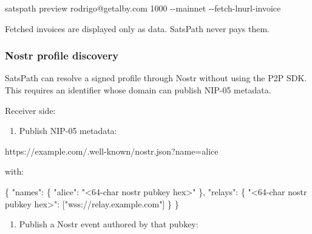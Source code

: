 \documentclass[
]{article}
\newenvironment{Shaded}{}{}
\newcommand{\AttributeTok}[1]{\textcolor[rgb]{0.49,0.56,0.16}{#1}}
\newcommand{\DataTypeTok}[1]{\textcolor[rgb]{0.56,0.13,0.00}{#1}}
\newcommand{\ExtensionTok}[1]{#1}
\newcommand{\FunctionTok}[1]{\textcolor[rgb]{0.02,0.16,0.49}{#1}}
\newcommand{\NormalTok}[1]{#1}
\newcommand{\OtherTok}[1]{\textcolor[rgb]{0.00,0.44,0.13}{#1}}
\newcommand{\StringTok}[1]{\textcolor[rgb]{0.25,0.44,0.63}{#1}}
\providecommand{\tightlist}{%
  \setlength{\itemsep}{0pt}\setlength{\parskip}{0pt}}
\begin{document}
\begin{Shaded}
\begin{Highlighting}[]
\ExtensionTok{satspath}\NormalTok{ preview rodrigo@getalby.com 1000 }\AttributeTok{{-}{-}mainnet} \AttributeTok{{-}{-}fetch{-}lnurl{-}invoice}
\end{Highlighting}
\end{Shaded}

Fetched invoices are displayed only as data. SatsPath never pays them.

\hypertarget{nostr-profile-discovery}{%
\subsubsection{Nostr profile discovery}\label{nostr-profile-discovery}}

SatsPath can resolve a signed profile through Nostr without using the
P2P SDK. This requires an identifier whose domain can publish NIP-05
metadata.

Receiver side:

\begin{enumerate}
\def\labelenumi{\arabic{enumi}.}
\tightlist
\item
  Publish NIP-05 metadata:
\end{enumerate}

\begin{Shaded}
\begin{Highlighting}[]
\NormalTok{https://example.com/.well{-}known/nostr.json?name=alice}
\end{Highlighting}
\end{Shaded}

with:

\begin{Shaded}
\begin{Highlighting}[]
\FunctionTok{\{}
  \DataTypeTok{"names"}\FunctionTok{:} \FunctionTok{\{}
    \DataTypeTok{"alice"}\FunctionTok{:} \StringTok{"\textless{}64{-}char nostr pubkey hex\textgreater{}"}
  \FunctionTok{\},}
  \DataTypeTok{"relays"}\FunctionTok{:} \FunctionTok{\{}
    \DataTypeTok{"\textless{}64{-}char nostr pubkey hex\textgreater{}"}\FunctionTok{:} \OtherTok{[}\StringTok{"wss://relay.example.com"}\OtherTok{]}
  \FunctionTok{\}}
\FunctionTok{\}}
\end{Highlighting}
\end{Shaded}

\begin{enumerate}
\def\labelenumi{\arabic{enumi}.}
\setcounter{enumi}{1}
\tightlist
\item
  Publish a Nostr event authored by that pubkey:
\end{enumerate}
\end{document}
